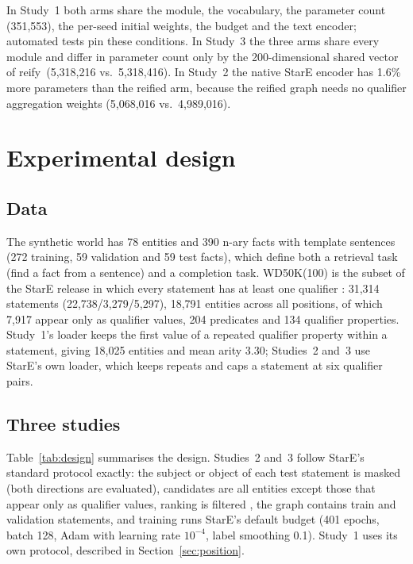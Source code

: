 \documentclass[11pt,a4paper]{article}
\newcommand{\reif}{\textsf{reify}}
\begin{document}
In Study~1 both arms share the module, the vocabulary, the parameter count (351,553), the per-seed initial weights, the budget and the text encoder; automated tests pin these conditions. In Study~3 the three arms share every module and differ in parameter count only by the 200-dimensional shared vector of \reif\ (5,318,216 vs.\ 5,318,416). In Study~2 the native StarE encoder has 1.6\% more parameters than the reified arm, because the reified graph needs no qualifier aggregation weights (5,068,016 vs.\ 4,989,016).

\section{Experimental design}

\subsection{Data}

The synthetic world has 78 entities and 390 n-ary facts with template sentences (272 training, 59 validation and 59 test facts), which define both a retrieval task (find a fact from a sentence) and a completion task. WD50K(100) is the subset of the StarE release in which every statement has at least one qualifier \citep{galkin2020stare}: 31,314 statements (22,738/3,279/5,297), 18,791 entities across all positions, of which 7,917 appear only as qualifier values, 204 predicates and 134 qualifier properties. Study~1's loader keeps the first value of a repeated qualifier property within a statement, giving 18,025 entities and mean arity 3.30; Studies~2 and~3 use StarE's own loader, which keeps repeats and caps a statement at six qualifier pairs.

\subsection{Three studies}

Table~\ref{tab:design} summarises the design. Studies~2 and~3 follow StarE's standard protocol exactly: the subject or object of each test statement is masked (both directions are evaluated), candidates are all entities except those that appear only as qualifier values, ranking is filtered \citep{bordes2013transe}, the graph contains train and validation statements, and training runs StarE's default budget (401 epochs, batch 128, Adam with learning rate $10^{-4}$, label smoothing 0.1). Study~1 uses its own protocol, described in Section~\ref{sec:position}.
\end{document}
